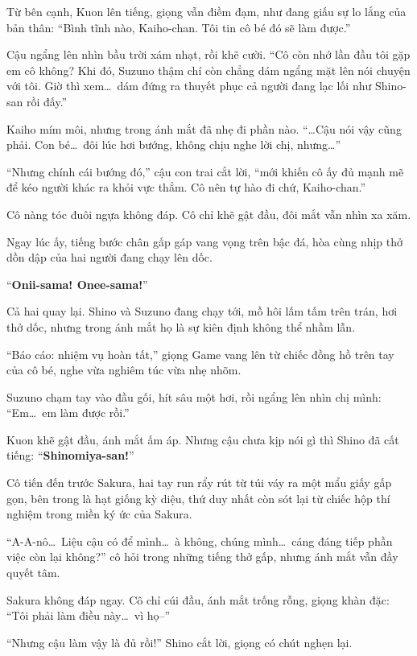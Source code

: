 \documentclass[../main.tex]{subfiles}
\begin{document}
Từ bên cạnh, Kuon lên tiếng, giọng vẫn điềm đạm, như đang giấu sự lo lắng của bản thân: ``Bình tĩnh nào, Kaiho-chan. Tôi tin cô bé đó sẽ làm được.''

Cậu ngẩng lên nhìn bầu trời xám nhạt, rồi khẽ cười. ``Cô còn nhớ lần đầu tôi gặp em cô không? Khi đó, Suzuno thậm chí còn chẳng dám ngẩng mặt lên nói chuyện với tôi. Giờ thì xem\dots\ dám đứng ra thuyết phục cả người đang lạc lối như Shino-san rồi đấy.''

Kaiho mím môi, nhưng trong ánh mắt đã nhẹ đi phần nào. ``\dots Cậu nói vậy cũng phải. Con bé\dots\ đôi lúc hơi bướng, không chịu nghe lời chị, nhưng\dots''

``Nhưng chính cái bướng đó,'' cậu con trai cắt lời, ``mới khiến cô ấy đủ mạnh mẽ để kéo người khác ra khỏi vực thẳm. Cô nên tự hào đi chứ, Kaiho-chan.''

Cô nàng tóc đuôi ngựa không đáp. Cô chỉ khẽ gật đầu, đôi mắt vẫn nhìn xa xăm.

Ngay lúc ấy, tiếng bước chân gấp gáp vang vọng trên bậc đá, hòa cùng nhịp thở dồn dập của hai người đang chạy lên dốc.

``\textbf{Onii-sama! Onee-sama!}''

Cả hai quay lại. Shino và Suzuno đang chạy tới, mồ hôi lấm tấm trên trán, hơi thở dốc, nhưng trong ánh mắt họ là sự kiên định không thể nhầm lẫn.

``Báo cáo: nhiệm vụ hoàn tất,'' giọng Game vang lên từ chiếc đồng hồ trên tay của cô bé, nghe vừa nghiêm túc vừa nhẹ nhõm.

Suzuno chạm tay vào đầu gối, hít sâu một hơi, rồi ngẩng lên nhìn chị mình: ``Em\dots\ em làm được rồi.''

Kuon khẽ gật đầu, ánh mắt ấm áp. Nhưng cậu chưa kịp nói gì thì Shino đã cất tiếng: ``\textbf{Shinomiya-san!}''

Cô tiến đến trước Sakura, hai tay run rẩy rút từ túi váy ra một mẩu giấy gấp gọn, bên trong là hạt giống kỳ diệu, thứ duy nhất còn sót lại từ chiếc hộp thí nghiệm trong miền ký ức của Sakura.


``A-A-nô\dots\ Liệu cậu có để mình\dots\ à không, chúng mình\dots\ cáng đáng tiếp phần việc còn lại không?'' cô hỏi trong những tiếng thở gấp, nhưng ánh mắt vẫn đầy quyết tâm.

Sakura không đáp ngay. Cô chỉ cúi đầu, ánh mắt trống rỗng, giọng khàn đặc: ``Tôi phải làm điều này\dots\ vì họ--''

``Nhưng cậu làm vậy là đủ rồi!'' Shino cắt lời, giọng có chút nghẹn lại.
\end{document}

